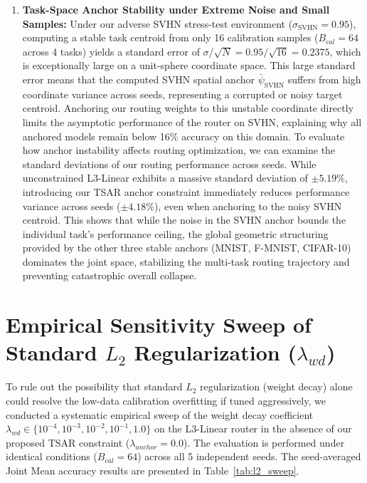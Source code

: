 \begin{enumerate}
    \item \textbf{Task-Space Anchor Stability under Extreme Noise and Small Samples:}
    Under our adverse SVHN stress-test environment ($\sigma_{\text{SVHN}} = 0.95$), computing a stable task centroid from only 16 calibration samples ($B_{cal} = 64$ across 4 tasks) yields a standard error of $\sigma / \sqrt{N} = 0.95/\sqrt{16} = 0.2375$, which is exceptionally large on a unit-sphere coordinate space. This large standard error means that the computed SVHN spatial anchor $\bar{\psi}_{\text{SVHN}}$ suffers from high coordinate variance across seeds, representing a corrupted or noisy target centroid. Anchoring our routing weights to this unstable coordinate directly limits the asymptotic performance of the router on SVHN, explaining why all anchored models remain below 16\% accuracy on this domain. To evaluate how anchor instability affects routing optimization, we can examine the standard deviations of our routing performance across seeds. While unconstrained L3-Linear exhibits a massive standard deviation of $\pm 5.19\%$, introducing our TSAR anchor constraint immediately reduces performance variance across seeds ($\pm 4.18\%$), even when anchoring to the noisy SVHN centroid. This shows that while the noise in the SVHN anchor bounds the individual task's performance ceiling, the global geometric structuring provided by the other three stable anchors (MNIST, F-MNIST, CIFAR-10) dominates the joint space, stabilizing the multi-task routing trajectory and preventing catastrophic overall collapse.
\end{enumerate}

\section{Empirical Sensitivity Sweep of Standard $L_2$ Regularization ($\lambda_{wd}$)}
\label{sec:l2_sweep}

To rule out the possibility that standard $L_2$ regularization (weight decay) alone could resolve
the low-data calibration overfitting if tuned aggressively, we conducted a systematic empirical
sweep of the weight decay coefficient $\lambda_{wd} \in \{10^{-4}, 10^{-3}, 10^{-2}, 10^{-1}, 1.0\}$
on the L3-Linear router in the absence of our proposed TSAR constraint ($\lambda_{anchor}=0.0$). The
evaluation is performed under identical conditions ($B_{cal}=64$) across all 5 independent seeds.
The seed-averaged Joint Mean accuracy results are presented in Table~\ref{tab:l2_sweep}.

